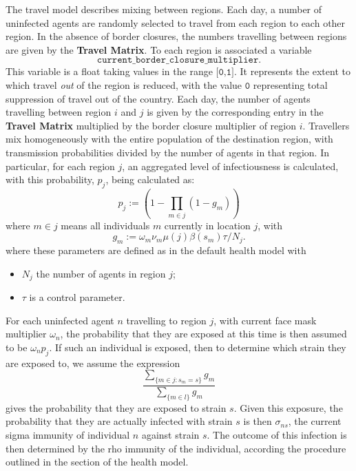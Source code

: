 \documentclass[10pt,letterpaper]{article}
\begin{document}
The travel model describes mixing between regions. Each day, a number of uninfected agents are randomly selected to travel from each region to each other region. In the absence of border closures, the numbers travelling between regions are given by the \textbf{Travel Matrix}. To each region is associated a variable $$\texttt{current{\_}border{\_}closure{\_}multiplier}.$$ This variable is a float taking values in the range $\texttt{[0,1]}.$ It represents the extent to which travel \textit{out} of the region is reduced, with the value $\texttt{0}$ representing total suppression of travel out of the country. Each day, the number of agents travelling between region $i$ and $j$ is given by the corresponding entry in the \textbf{Travel Matrix} multiplied by the border closure multiplier of region $i$. Travellers mix homogeneously with the entire population of the destination region, with transmission probabilities divided by the number of agents in that region. In particular, for each region $j$, an aggregated level of infectiousness is calculated, with this probability, $p_j$, being calculated as:
\begin{equation*}
p_j := \left(1 - \prod_{m \in j} (1 - g_m)\right)
\end{equation*}
where $m \in j$ means all individuals $m$ currently in location $j$, with
\begin{equation*}
g_m  := \omega_m \nu_m \mu(j) \beta(s_m) \tau / N_j.
\end{equation*}
where these parameters are defined as in the default health model with
\begin{itemize}
\item $N_j$ the number of agents in region $j$;
\item $\tau$ is a control parameter.
\end{itemize}
For each uninfected agent $n$ travelling to region $j$, with current face mask multiplier $\omega_n$, the probability that they are exposed at this time is then assumed to be $\omega_n p_j$. If such an individual is exposed, then to determine which strain they are exposed to, we assume the expression
\begin{equation*}
\frac{\sum_{\{m \in j: s_m = s\}} g_m}{\sum_{\{m \in l\}} g_m}
\end{equation*}
gives the probability that they are exposed to strain $s$. Given this exposure, the probability that they are actually infected with strain $s$ is then $\sigma_{ns}$, the current sigma immunity of individual $n$ against strain $s$. The outcome of this infection is then determined by the rho immunity of the individual, according the procedure outlined in the section of the health model.
\end{document}

